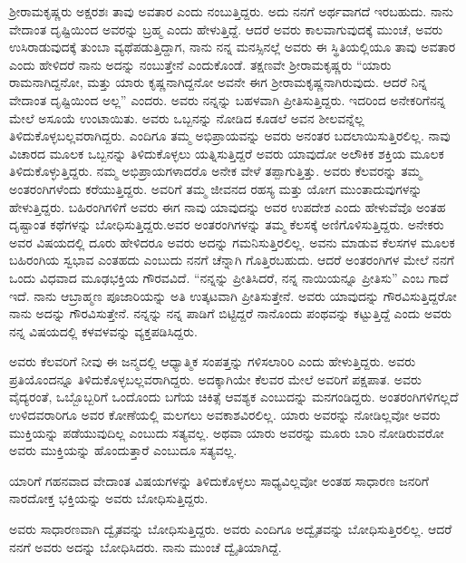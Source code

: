 ಶ‍್ರೀರಾಮಕೃಷ್ಣರು ಅಕ್ಷರಶಃ ತಾವು ಅವತಾರ ಎಂದು ನಂಬುತ್ತಿದ್ದರು. ಅದು ನನಗೆ ಅರ್ಥವಾಗದೆ ಇರಬಹುದು. ನಾನು ವೇದಾಂತ ದೃಷ್ಟಿಯಿಂದ ಅವರನ್ನು ಬ್ರಹ್ಮ ಎಂದು ಹೇಳುತ್ತಿದ್ದೆ. ಆದರೆ ಅವರು ಕಾಲವಾಗುವುದಕ್ಕೆ ಮುಂಚೆ, ಅವರು ಉಸಿರಾಡುವುದಕ್ಕೆ ತುಂಬಾ ವ್ಯಥೆಪಡುತ್ತಿದ್ದಾಗ, ನಾನು ನನ್ನ ಮನಸ್ಸಿನಲ್ಲೆ ಅವರು ಈ ಸ್ಥಿತಿಯಲ್ಲಿಯೂ ತಾವು ಅವತಾರ ಎಂದು ಹೇಳಿದರೆ ನಾನು ಅದನ್ನು ನಂಬುತ್ತೇನೆ ಎಂದುಕೊಂಡೆ. ತಕ್ಷಣವೇ ಶ‍್ರೀರಾಮಕೃಷ್ಣರು “ಯಾರು ರಾಮನಾಗಿದ್ದನೋ, ಮತ್ತು ಯಾರು ಕೃಷ್ಣನಾಗಿದ್ದನೋ ಅವನೇ ಈಗ ಶ‍್ರೀರಾಮಕೃಷ್ಣನಾಗಿರುವುದು. ಆದರೆ ನಿನ್ನ ವೇದಾಂತ ದೃಷ್ಟಿಯಿಂದ ಅಲ್ಲ” ಎಂದರು. ಅವರು ನನ್ನನ್ನು ಬಹಳವಾಗಿ ಪ್ರೀತಿಸುತ್ತಿದ್ದರು. ಇದರಿಂದ ಅನೇಕರಿಗೆ\break ನನ್ನ ಮೇಲೆ ಅಸೂಯೆ ಉಂಟಾಯಿತು. ಅವರು ಒಬ್ಬನನ್ನು ನೋಡಿದ ಕೂಡಲೆ ಅವನ ಶೀಲವನ್ನೆಲ್ಲ ತಿಳಿದುಕೊಳ್ಳಬಲ್ಲವರಾಗಿದ್ದರು. ಎಂದಿಗೂ ತಮ್ಮ ಅಭಿಪ್ರಾಯವನ್ನು ಅವರು ಅನಂತರ ಬದಲಾಯಿಸುತ್ತಿರಲಿಲ್ಲ. ನಾವು ವಿಚಾರದ ಮೂಲಕ ಒಬ್ಬನನ್ನು ತಿಳಿದುಕೊಳ್ಳಲು ಯತ್ನಿಸುತ್ತಿದ್ದರೆ ಅವರು ಯಾವುದೋ ಅಲೌಕಿಕ ಶಕ್ತಿಯ ಮೂಲಕ ತಿಳಿದುಕೊಳ್ಳುತ್ತಿದ್ದರು. ನಮ್ಮ ಅಭಿಪ್ರಾಯಗಳಾದರೊ ಅನೇಕ ವೇಳೆ ತಪ್ಪಾಗುತ್ತಿತ್ತು. ಅವರು ಕೆಲವರನ್ನು ತಮ್ಮ ಅಂತರಂಗಿಗಳೆಂದು ಕರೆಯುತ್ತಿದ್ದರು. ಅವರಿಗೆ ತಮ್ಮ ಜೀವನದ ರಹಸ್ಯ ಮತ್ತು ಯೋಗ ಮುಂತಾದುವುಗಳನ್ನು ಹೇಳುತ್ತಿದ್ದರು. ಬಹಿರಂಗಿಗಳಿಗೆ ಅವರು ಈಗ ನಾವು ಯಾವುದನ್ನು ಅವರ ಉಪದೇಶ ಎಂದು ಹೇಳುವೆವೊ ಅಂತಹ ದೃಷ್ಟಾಂತ ಕಥೆಗಳನ್ನು ಬೋಧಿಸುತ್ತಿದ್ದರು.\break ಅವರ ಅಂತರಂಗಿಗಳನ್ನು ತಮ್ಮ ಕೆಲಸಕ್ಕೆ ಅಣಿಗೊಳಿಸುತ್ತಿದ್ದರು. ಅನೇಕರು ಅವರ ವಿಷಯದಲ್ಲಿ ದೂರು ಹೇಳಿದರೂ ಅವರು ಅದನ್ನು ಗಮನಿಸುತ್ತಿರಲಿಲ್ಲ. ಅವನು ಮಾಡುವ ಕೆಲಸಗಳ ಮೂಲಕ ಬಹಿರಂಗಿಯ ಸ್ವಭಾವ ಎಂತಹದು ಎಂಬುದು ನನಗೆ ಚೆನ್ನಾಗಿ ಗೊತ್ತಿರಬಹುದು. ಆದರೆ ಅಂತರಂಗಿಗಳ ಮೇಲೆ ನನಗೆ ಒಂದು ವಿಧವಾದ ಮೂಢಭಕ್ತಿಯ ಗೌರವವಿದೆ. “ನನ್ನನ್ನು ಪ್ರೀತಿಸಿದರೆ, ನನ್ನ ನಾಯಿಯನ್ನೂ ಪ್ರೀತಿಸು” ಎಂಬ ಗಾದೆ ಇದೆ. ನಾನು ಆ\break ಬ್ರಾಹ್ಮಣ ಪೂಜಾರಿಯನ್ನು ಅತಿ ಉತ್ಕಟವಾಗಿ ಪ್ರೀತಿಸುತ್ತೇನೆ. ಅವರು ಯಾವುದನ್ನು ಗೌರವಿಸುತ್ತಿದ್ದರೋ ನಾನು ಅದನ್ನು ಗೌರವಿಸುತ್ತೇನೆ. ನನ್ನನ್ನು ನನ್ನ ಪಾಡಿಗೆ ಬಿಟ್ಟಿದ್ದರೆ ನಾನೊಂದು ಪಂಥವನ್ನು ಕಟ್ಟುತ್ತಿದ್ದೆ ಎಂದು ಅವರು ನನ್ನ ವಿಷಯದಲ್ಲಿ ಕಳವಳವನ್ನು ವ್ಯಕ್ತಪಡಿಸಿದ್ದರು.

\vskip 5pt

ಅವರು ಕೆಲವರಿಗೆ ನೀವು ಈ ಜನ್ಮದಲ್ಲಿ ಆಧ್ಯಾತ್ಮಿಕ ಸಂಪತ್ತನ್ನು ಗಳಿಸಲಾರಿರಿ ಎಂದು ಹೇಳುತ್ತಿದ್ದರು. ಅವರು ಪ್ರತಿಯೊಂದನ್ನೂ ತಿಳಿದುಕೊಳ್ಳಬಲ್ಲವರಾಗಿದ್ದರು. ಅದಕ್ಕಾಗಿಯೇ ಕೆಲವರ ಮೇಲೆ ಅವರಿಗೆ ಪಕ್ಷಪಾತ. ಅವರು ವೈದ್ಯರಂತೆ, ಒಬ್ಬೊಬ್ಬರಿಗೆ ಒಂದೊಂದು ಬಗೆಯ ಚಿಕಿತ್ಸೆ ಆವಶ್ಯಕ ಎಂಬುದನ್ನು ಮನಗಂಡಿದ್ದರು. ಅಂತರಂಗಿಗಳಿಗಲ್ಲದೆ ಉಳಿದವರಾರಿಗೂ ಅವರ ಕೋಣೆಯಲ್ಲಿ ಮಲಗಲು ಅವಕಾಶವಿರಲಿಲ್ಲ. ಯಾರು ಅವರನ್ನು ನೋಡಿಲ್ಲವೋ ಅವರು ಮುಕ್ತಿಯನ್ನು ಪಡೆಯುವುದಿಲ್ಲ ಎಂಬುದು ಸತ್ಯವಲ್ಲ. ಅಥವಾ ಯಾರು ಅವರನ್ನು ಮೂರು ಬಾರಿ ನೋಡಿರುವರೋ ಅವರು ಮುಕ್ತಿಯನ್ನು ಹೊಂದುತ್ತಾರೆ ಎಂಬುದೂ ಸತ್ಯವಲ್ಲ.

\vskip 5pt

ಯಾರಿಗೆ ಗಹನವಾದ ವೇದಾಂತ ವಿಷಯಗಳನ್ನು ತಿಳಿದುಕೊಳ್ಳಲು ಸಾಧ್ಯವಿಲ್ಲವೋ ಅಂತಹ ಸಾಧಾರಣ ಜನರಿಗೆ ನಾರದೋಕ್ತ ಭಕ್ತಿಯನ್ನು ಅವರು ಬೋಧಿಸುತ್ತಿದ್ದರು.

\vskip 5pt

ಅವರು ಸಾಧಾರಣವಾಗಿ ದ್ವೈತವನ್ನು ಬೋಧಿಸುತ್ತಿದ್ದರು. ಅವರು ಎಂದಿಗೂ ಅದ್ವೈತವನ್ನು ಬೋಧಿಸುತ್ತಿರಲಿಲ್ಲ. ಆದರೆ ನನಗೆ ಅವರು ಅದನ್ನು ಬೋಧಿಸಿದರು. ನಾನು ಮುಂಚೆ ದ್ವೈತಿಯಾಗಿದ್ದೆ.

